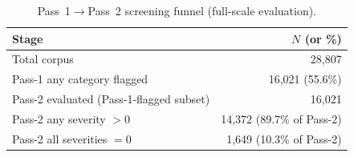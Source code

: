 \begin{table}[htbp]
    \centering
    \caption{Pass~1$\to$Pass~2 screening funnel (full-scale evaluation).}
    \label{tab:pass1_pass2_funnel}
    \begin{tabular}{lr}
        \toprule
        Stage & $N$ (or \%) \\
        \midrule
        Total corpus & 28{,}807 \\
        Pass-1 any category flagged & 16{,}021 (55.6\%) \\
        Pass-2 evaluated (Pass-1-flagged subset) & 16{,}021 \\
        Pass-2 any severity $> 0$ & 14{,}372 (89.7\% of Pass-2) \\
        Pass-2 all severities $= 0$ & 1{,}649 (10.3\% of Pass-2) \\
        \bottomrule
    \end{tabular}
\end{table}
